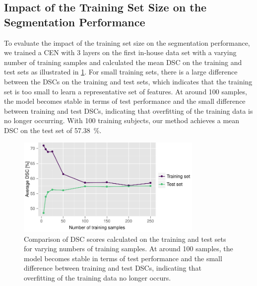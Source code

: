 \subsection[Impact of the training set size on the segmentation
performance]{Impact of the Training Set Size on the Segmentation Performance}

To evaluate the impact of the training set size on the segmentation performance,
we trained a CEN with 3 layers on the first in-house data set with a varying
number of training samples and calculated the mean DSC on the training and test
sets as illustrated in \ref{fig:bioms}. For small training sets, there is a
large difference between the DSCs on the training and test sets, which indicates
that the training set is too small to learn a representative set of features. At
around 100 samples, the model becomes stable in terms of test performance and
the small difference between training and test DSCs, indicating that overfitting
of the training data is no longer occurring. With 100 training subjects, our
method achieves a mean DSC on the test set of \SI{57.38}{\percent}.


\begin{figure}[tb]
\centering
\includegraphics[width=0.8\textwidth]{figures/train_count}
\caption[Comparison of DSC scores calculated on the training and test sets for
varying numbers of training samples]{Comparison of DSC scores calculated on the
training and test sets for varying numbers of training samples. At around 100
samples, the model becomes stable in terms of test performance and the small
difference between training and test DSCs, indicating that overfitting of the
training data no longer occurs.}
\label{fig:bioms}
\end{figure}

